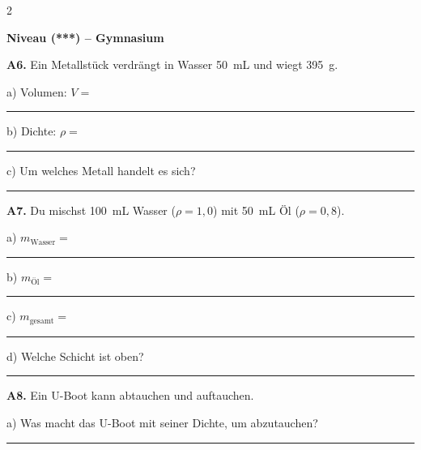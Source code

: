 \documentclass[10pt, a4paper]{article}
\newcommand{\fachfarbe}{physik}
\newcommand{\luecke}[1]{\rule{#1}{0.4pt}}
\newcommand{\abschnitt}[1]{%
    \vspace{6pt}
    \noindent\textbf{\textcolor{\fachfarbe}{#1}}
    \vspace{3pt}
}
\begin{document}
\begin{multicols}{2}

\columnbreak


\abschnitt{Niveau (***) -- Gymnasium}

\textbf{A6.} Ein Metallstück verdrängt in Wasser \SI{50}{mL} und wiegt \SI{395}{g}.

\vspace{3pt}

a) Volumen: $V = $ \luecke{2cm}

\vspace{4pt}

b) Dichte: $\rho = $ \luecke{2cm}

\vspace{4pt}

c) Um welches Metall handelt es sich?

\vspace{2pt}
\luecke{4cm}

\vspace{8pt}

\textbf{A7.} Du mischst \SI{100}{mL} Wasser ($\rho = 1,0$) mit \SI{50}{mL} Öl ($\rho = 0,8$).

\vspace{3pt}

a) $m_\text{Wasser} = $ \luecke{2cm}

\vspace{4pt}

b) $m_\text{Öl} = $ \luecke{2cm}

\vspace{4pt}

c) $m_\text{gesamt} = $ \luecke{2cm}

\vspace{4pt}

d) Welche Schicht ist oben? \luecke{2cm}

\vspace{10pt}

\textbf{A8.} Ein U-Boot kann abtauchen und auftauchen.

\vspace{3pt}

a) Was macht das U-Boot mit seiner Dichte, um abzutauchen?

\vspace{2pt}
\luecke{5cm}


\end{multicols}
\end{document}
